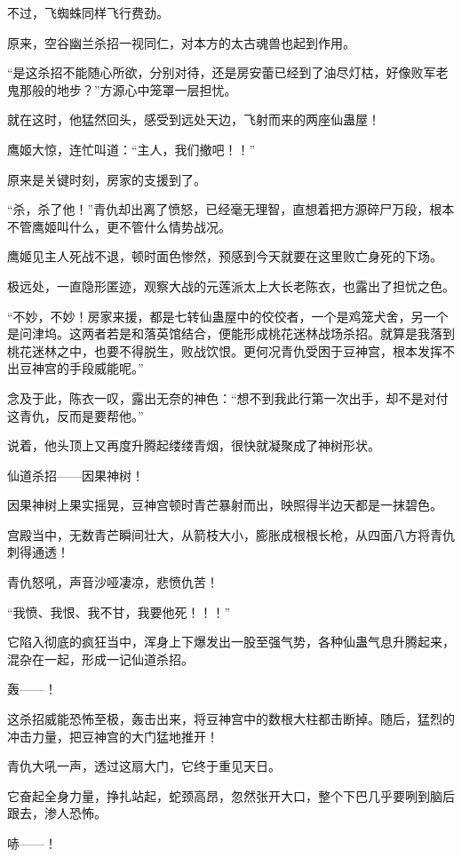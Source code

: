 \begin{this_body}
不过，飞蜘蛛同样飞行费劲。

原来，空谷幽兰杀招一视同仁，对本方的太古魂兽也起到作用。

“是这杀招不能随心所欲，分别对待，还是房安蕾已经到了油尽灯枯，好像败军老鬼那般的地步？”方源心中笼罩一层担忧。

就在这时，他猛然回头，感受到远处天边，飞射而来的两座仙蛊屋！

鹰姬大惊，连忙叫道：“主人，我们撤吧！！”

原来是关键时刻，房家的支援到了。

“杀，杀了他！”青仇却出离了愤怒，已经毫无理智，直想着把方源碎尸万段，根本不管鹰姬叫什么，更不管什么情势战况。

鹰姬见主人死战不退，顿时面色惨然，预感到今天就要在这里败亡身死的下场。

极远处，一直隐形匿迹，观察大战的元莲派太上大长老陈衣，也露出了担忧之色。

“不妙，不妙！房家来援，都是七转仙蛊屋中的佼佼者，一个是鸡笼犬舍，另一个是问津坞。这两者若是和落英馆结合，便能形成桃花迷林战场杀招。就算是我落到桃花迷林之中，也要不得脱生，败战饮恨。更何况青仇受困于豆神宫，根本发挥不出豆神宫的手段威能呢。”

念及于此，陈衣一叹，露出无奈的神色：“想不到我此行第一次出手，却不是对付这青仇，反而是要帮他。”

说着，他头顶上又再度升腾起缕缕青烟，很快就凝聚成了神树形状。

仙道杀招——因果神树！

因果神树上果实摇晃，豆神宫顿时青芒暴射而出，映照得半边天都是一抹碧色。

宫殿当中，无数青芒瞬间壮大，从箭枝大小，膨胀成根根长枪，从四面八方将青仇刺得通透！

青仇怒吼，声音沙哑凄凉，悲愤仇苦！

“我愤、我恨、我不甘，我要他死！！！”

它陷入彻底的疯狂当中，浑身上下爆发出一股至强气势，各种仙蛊气息升腾起来，混杂在一起，形成一记仙道杀招。

轰——！

这杀招威能恐怖至极，轰击出来，将豆神宫中的数根大柱都击断掉。随后，猛烈的冲击力量，把豆神宫的大门猛地推开！

青仇大吼一声，透过这扇大门，它终于重见天日。

它奋起全身力量，挣扎站起，蛇颈高昂，忽然张开大口，整个下巴几乎要咧到脑后跟去，渗人恐怖。

哧——！


\end{this_body}

